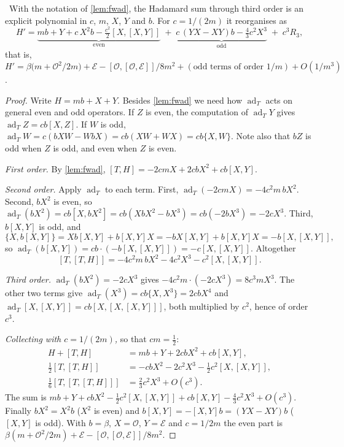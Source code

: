 \begin{theorem}\label{thm:fworder}\ver\
With the notation of \cref{lem:fwad}, the Hadamard sum through third order is an explicit polynomial in $c$, $m$, $X$, $Y$ and $b$. For $c=1/(2m)$ it reorganises as
\[
H'=\underbrace{mb+Y+c\,X^2b-\tfrac{c^2}{2}[X,[X,Y]]}_{\text{even}}\;+\;\underbrace{c\,(YX-XY)b-\tfrac43c^2X^3}_{\text{odd}}\;+\;c^3R_3 ,
\]
that is, $H'=\beta\bigl(m+\mathcal O^2/2m\bigr)+\mathcal E-[\mathcal O,[\mathcal O,\mathcal E]]/8m^2+(\text{odd terms of order }1/m)+O(1/m^3)$.
\end{theorem}
\begin{proof}
Write $H=mb+X+Y$. Besides \cref{lem:fwad} we need how $\operatorname{ad}_T$ acts on general even and odd operators. If $Z$ is even, the computation of $\operatorname{ad}_TY$ gives $\operatorname{ad}_TZ=cb[X,Z]$. If $W$ is odd, $\operatorname{ad}_TW=c(bXW-WbX)=cb(XW+WX)=cb\{X,W\}$. Note also that $bZ$ is odd when $Z$ is odd, and even when $Z$ is even.

\emph{First order.} By \cref{lem:fwad}, $[T,H]=-2cmX+2cbX^2+cb[X,Y]$.

\emph{Second order.} Apply $\operatorname{ad}_T$ to each term. First, $\operatorname{ad}_T(-2cmX)=-4c^2m\,bX^2$. Second, $bX^2$ is even, so $\operatorname{ad}_T(bX^2)=cb[X,bX^2]=cb(XbX^2-bX^3)=cb(-2bX^3)=-2cX^3$. Third, $b[X,Y]$ is odd, and
\[
\{X,b[X,Y]\}=Xb[X,Y]+b[X,Y]X=-bX[X,Y]+b[X,Y]X=-b[X,[X,Y]],
\]
so $\operatorname{ad}_T(b[X,Y])=cb\cdot(-b[X,[X,Y]])=-c[X,[X,Y]]$. Altogether
\[
[T,[T,H]]=-4c^2m\,bX^2-4c^2X^3-c^2[X,[X,Y]].
\]

\emph{Third order.} $\operatorname{ad}_T(bX^2)=-2cX^3$ gives $-4c^2m\cdot(-2cX^3)=8c^3mX^3$. The other two terms give $\operatorname{ad}_T(X^3)=cb\{X,X^3\}=2cbX^4$ and $\operatorname{ad}_T[X,[X,Y]]=cb[X,[X,[X,Y]]]$, both multiplied by $c^2$, hence of order $c^3$.

\emph{Collecting with $c=1/(2m)$,} so that $cm=\frac12$:
\begin{align*}
H+[T,H]&=mb+Y+2cbX^2+cb[X,Y],\\
\tfrac12[T,[T,H]]&=-cbX^2-2c^2X^3-\tfrac12c^2[X,[X,Y]],\\
\tfrac16[T,[T,[T,H]]]&=\tfrac23c^2X^3+O(c^3).
\end{align*}
The sum is $mb+Y+cbX^2-\frac12c^2[X,[X,Y]]+cb[X,Y]-\frac43c^2X^3+O(c^3)$. Finally $bX^2=X^2b$ ($X^2$ is even) and $b[X,Y]=-[X,Y]b=(YX-XY)b$ ($[X,Y]$ is odd). With $b=\beta$, $X=\mathcal O$, $Y=\mathcal E$ and $c=1/2m$ the even part is $\beta(m+\mathcal O^2/2m)+\mathcal E-[\mathcal O,[\mathcal O,\mathcal E]]/8m^2$.
\end{proof}


